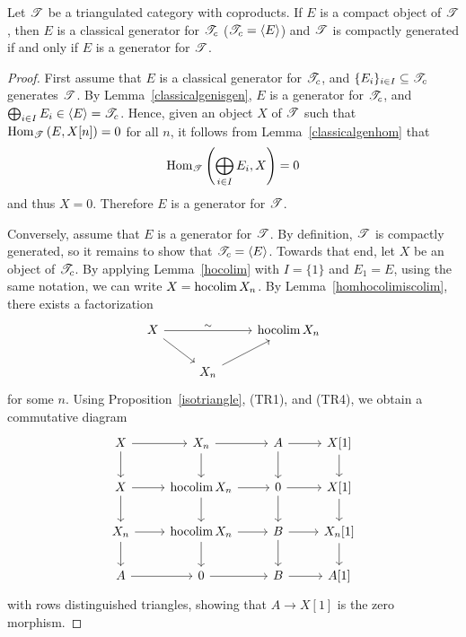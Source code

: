 \documentclass[dissertation.tex]{subfiles}
\begin{document}
\begin{prop}\label{GeneratorIFFClassicAndCompactlyGenerated}
  Let $\mathscr{T}$ be a triangulated category with coproducts.
  If $E$ is a compact object of $\mathscr{T}$, then
  $E$ is a classical generator for $\mathscr{T}_c$ ($\mathscr{T}_c = \langle E \rangle$) and $\mathscr{T}$ is compactly generated 
  if and only if
  $E$ is a generator for $\mathscr{T}$.
  
  \begin{proof}
    First assume that $E$ is a classical generator for $\mathscr{T}_c$, and $\{E_i\}_{i \in I} \subseteq \mathscr{T}_c$ generates $\mathscr{T}$.
    By Lemma~\ref{classicalgenisgen}, $E$ is a generator for $\mathscr{T}_c$, and $\bigoplus_{i \in I}E_i \in \langle E \rangle = \mathscr{T}_c$.
    Hence, given an object $X$ of $\mathscr{T}$ such that $\operatorname{Hom}_{\mathscr{T}}\left(E,X[n]\right) = 0$ for all $n$, it follows from Lemma~\ref{classicalgenhom} that
    $$\operatorname{Hom}_{\mathscr{T}}\left(\bigoplus_{i \in I}E_i, X\right) = 0$$
    and thus $X = 0$.
    Therefore $E$ is a generator for $\mathscr{T}$.
    
    Conversely, assume that $E$ is a generator for $\mathscr{T}$.
    By definition, $\mathscr{T}$ is compactly generated, so it remains to show that $\mathscr{T}_c = \langle E \rangle$.
    Towards that end, let $X$ be an object of $\mathscr{T}_c$.
    By applying Lemma~\ref{hocolim} with $I = \{1\}$ and $E_1 = E$, using the same notation, we can write $X = \operatorname{hocolim}X_n$.
    By Lemma~\ref{homhocolimiscolim}, there exists a factorization
    $$\begin{tikzcd}
      X \arrow{rd}\arrow{rr}{\sim} & & \op{hocolim} X_n\\
      & X_n\arrow{ur}
    \end{tikzcd}$$
    for some $n$.
    Using Proposition~\ref{isotriangle}, (TR1), and (TR4), we obtain a commutative diagram 
    $$\begin{tikzcd}
      X \arrow{r}\arrow{d} & X_n \arrow{r}\arrow{d} & A \arrow{d}\arrow{r} & X[1]\arrow{d}\\
      X \arrow{d}\arrow{r} & \op{hocolim}X_n \arrow{d}\arrow{r} & 0 \arrow{d}\arrow{r} & X[1]\arrow{d}\\
      X_n \arrow{d}\arrow{r} & \op{hocolim}X_n \arrow{d}\arrow{r} & B \arrow{r}\arrow{d} & X_n[1]\arrow{d}\\
      A \arrow{r} & 0 \arrow{r} & B \arrow{r} & A[1]
    \end{tikzcd}$$
    with rows distinguished triangles, showing that $A \rightarrow X[1]$ is the zero morphism.
    

\end{proof}
\end{prop}
\end{document}
